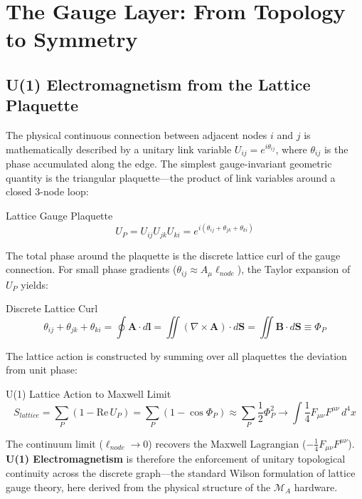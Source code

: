 \section{The Gauge Layer: From Topology to Symmetry}

\subsection{U(1) Electromagnetism from the Lattice Plaquette}
The physical continuous connection between adjacent nodes $i$ and $j$ is mathematically described by a unitary link variable $U_{ij} = e^{i\theta_{ij}}$, where $\theta_{ij}$ is the phase accumulated along the edge. The simplest gauge-invariant geometric quantity is the triangular plaquette---the product of link variables around a closed 3-node loop:
\begin{resultbox}{Lattice Gauge Plaquette}
\begin{equation}
    U_P = U_{ij}U_{jk}U_{ki} = e^{i(\theta_{ij} + \theta_{jk} + \theta_{ki})}
\end{equation}
\end{resultbox}

The total phase around the plaquette is the discrete lattice curl of the gauge connection. For small phase gradients ($\theta_{ij} \approx A_\mu \ell_{node}$), the Taylor expansion of $U_P$ yields:
\begin{resultbox}{Discrete Lattice Curl}
\begin{equation}
    \theta_{ij} + \theta_{jk} + \theta_{ki} = \oint \mathbf{A} \cdot d\mathbf{l} = \iint (\nabla \times \mathbf{A}) \cdot d\mathbf{S} = \iint \mathbf{B} \cdot d\mathbf{S} \equiv \Phi_P
\end{equation}
\end{resultbox}

The lattice action is constructed by summing over all plaquettes the deviation from unit phase:
\begin{resultbox}{U(1) Lattice Action to Maxwell Limit}
\begin{equation}
    S_{lattice} = \sum_P \left(1 - \text{Re}\, U_P\right) = \sum_P \left(1 - \cos\Phi_P\right) \approx \sum_P \frac{1}{2}\Phi_P^2 \longrightarrow \int \frac{1}{4}F_{\mu\nu}F^{\mu\nu}\, d^4x
\end{equation}
\end{resultbox}

The continuum limit ($\ell_{node} \to 0$) recovers the Maxwell Lagrangian ($-\frac{1}{4}F_{\mu\nu}F^{\mu\nu}$). \textbf{U(1) Electromagnetism} is therefore the enforcement of unitary topological continuity across the discrete graph---the standard Wilson formulation of lattice gauge theory, here derived from the physical structure of the $\mathcal{M}_A$ hardware.

